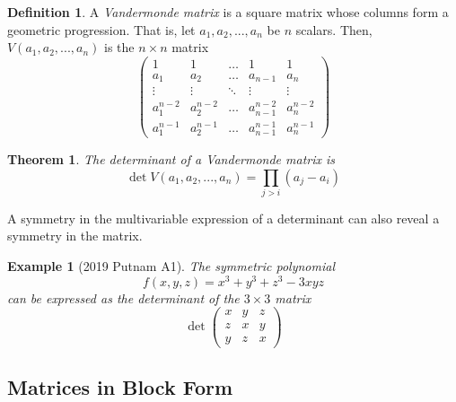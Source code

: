 \documentclass{article}
\newtheorem{theorem}{Theorem}[section]
\newtheorem{example}{Example}[section]
\theoremstyle{remark}
\theoremstyle{definition}
\newtheorem{definition}{Definition}[section]
\begin{document}
  \begin{definition}
  A \textit{Vandermonde matrix} is a square matrix whose columns form a geometric progression. That is, let $a_1, a_2, ..., a_n$ be $n$ scalars. Then, $V(a_1, a_2, ..., a_n)$ is the $n \times n$ matrix
  \[\begin{pmatrix}
  1&1&\ldots&1&1 \\
  a_1&a_2&\ldots&a_{n-1}&a_n\\
  \vdots&\vdots&\ddots&\vdots&\vdots\\
  a_1^{n-2}&a_2^{n-2}&\ldots&a_{n-1}^{n-2}&a_n^{n-2}\\
  a_1^{n-1}&a_2^{n-1}&\ldots&a_{n-1}^{n-1}&a_n^{n-1}
  \end{pmatrix}\]
  \end{definition}

  \begin{theorem}
  The determinant of a Vandermonde matrix is
  \[\det{V(a_1, a_2, ..., a_n)} = \prod_{j>i} (a_j - a_i)\]
  \end{theorem}

  A symmetry in the multivariable expression of a determinant can also reveal a symmetry in the matrix.

  \begin{example}[2019 Putnam A1]
  The symmetric polynomial 
  \[ f(x, y, z) = x^3 + y^3 + z^3 - 3 x y z\]
  can be expressed as the determinant of the $3 \times 3$ matrix
  \[\det{\begin{pmatrix}
  x&y&z\\
  z&x&y\\
  y&z&x
  \end{pmatrix}}\]
  \end{example}

  \subsection{Matrices in Block Form}
\end{document}

